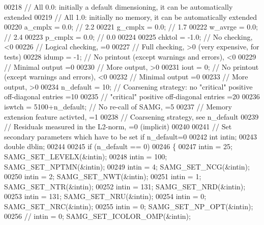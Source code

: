 \begin{DoxyCode}
00218     \textcolor{comment}{// All 0.0: initially a default dimensioning, it can be automatically extended}
00219     \textcolor{comment}{// All 1.0: initially no memory, it can be automatically extended}
00220     a\_cmplx   = 0.0;    \textcolor{comment}{// 2.2}
00221     g\_cmplx   = 0.0;    \textcolor{comment}{// 1.7}
00222     w\_avrge   = 0.0;    \textcolor{comment}{// 2.4}
00223     p\_cmplx   = 0.0;    \textcolor{comment}{// 0.0}
00224 
00225     chktol    = -1.0;   \textcolor{comment}{// No checking, <0}
00226                         \textcolor{comment}{// Logical checking, =0}
00227                         \textcolor{comment}{// Full checking, >0 (very expensive, for tests)}
00228     idump     = -1;      \textcolor{comment}{// No printout (except warnings and errors), <0}
00229                         \textcolor{comment}{// Minimal output =0}
00230                         \textcolor{comment}{// More output, >0}
00231     iout      = 0;      \textcolor{comment}{// No printout (except warnings and errors), <0}
00232                         \textcolor{comment}{// Minimal output =0}
00233                         \textcolor{comment}{// More output, >0}
00234     n\_default = 10;     \textcolor{comment}{// Coarsening strategy: no "critical" positive off-diagonal entries =10}
00235                         \textcolor{comment}{//                      "critical" positive off-diagonal entries =20}
00236     iswtch    = 5100+n\_default; \textcolor{comment}{// No re-call of SAMG, =5}
00237                                 \textcolor{comment}{// Memory extension feature activted, =1}
00238                                 \textcolor{comment}{// Coarsening strategy, see n\_default}
00239                                 \textcolor{comment}{// Residuals measured in the L2-norm, =0 (implicit)}
00240 
00241     \textcolor{comment}{// Set secondary parameters which have to be set if n\_default=0}
00242     \textcolor{keywordtype}{int} intin;
00243     \textcolor{keywordtype}{double} dblin;
00244 
00245     \textcolor{keywordflow}{if} (n\_default == 0)
00246     \{
00247         intin = 25;    SAMG\_SET\_LEVELX(&intin);
00248         intin = 100;   SAMG\_SET\_NPTMN(&intin);
00249         intin = 4;     SAMG\_SET\_NCG(&intin);
00250         intin = 2;     SAMG\_SET\_NWT(&intin);
00251         intin = 1;     SAMG\_SET\_NTR(&intin);
00252         intin = 131;   SAMG\_SET\_NRD(&intin);
00253         intin = 131;   SAMG\_SET\_NRU(&intin);
00254         intin = 0;     SAMG\_SET\_NRC(&intin);
00255         intin = 0;     SAMG\_SET\_NP\_OPT(&intin);
00256 \textcolor{comment}{//        intin = 0;     SAMG\_SET\_ICOLOR\_OMP(&intin);}

\end{DoxyCode}
